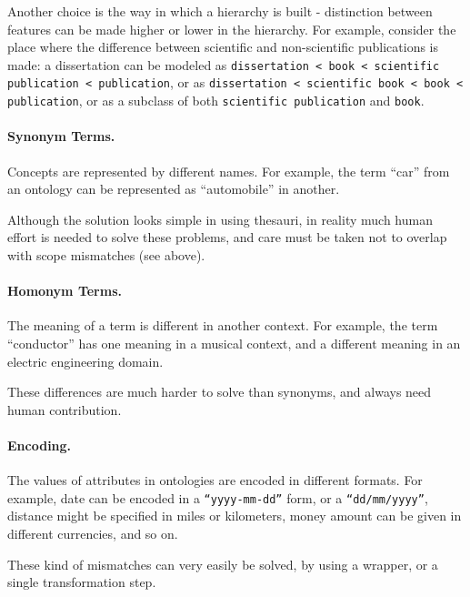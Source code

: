 \documentclass{fast_latex}
\begin{document}
Another choice is the way in which a hierarchy is built - distinction
between features can be made higher or lower in the hierarchy. For
example, consider the place where the difference between scientific and
non-scientific publications is made: a dissertation can be modeled as
\texttt{dissertation }\texttt{{\textless}
book {\textless} scientific publication {\textless} publication}, or as
\texttt{dissertation {\textless} scientific book
{\textless} book {\textless} publication}, or as a subclass of both
\texttt{scientific publication} and
\texttt{book}. 

\paragraph{Synonym Terms.}
Concepts are represented by different names. For example, the term
{\textquotedblleft}car{\textquotedblright} from an ontology can be
represented as {\textquotedblleft}automobile{\textquotedblright} in
another. 

Although the solution looks simple in using thesauri, in reality much
human effort is needed to solve these problems, and care must be taken
not to overlap with scope mismatches (see above). 

\paragraph{Homonym Terms.}
The meaning of a term is different in another context. For example, the
term {\textquotedblleft}conductor{\textquotedblright} has one meaning
in a musical context, and a different meaning in an electric
engineering domain. 

These differences are much harder to solve than synonyms, and always
need human contribution. 

\paragraph{Encoding.}
The values of attributes in ontologies are encoded in different formats.
For example, date can be encoded in a
\texttt{{\textquotedblleft}yyyy-mm-dd{\textquotedblright}}
form, or a
\texttt{{\textquotedblleft}dd/mm/yyyy{\textquotedblright}},
distance might be specified in miles or kilometers, money amount can be
given in different currencies, and so on. 

These kind of mismatches can very easily be solved, by using a wrapper,
or a single transformation step. 
\end{document}
